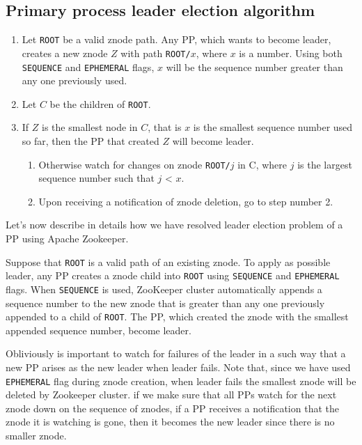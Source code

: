 \documentclass[sigchi]{acmart}
\begin{document}
\subsection{Primary process leader election algorithm}

\begin{algorithm}
\caption{}\label{alg:leaderElection}
\begin{enumerate}

\item Let \texttt{ROOT} be a valid znode path. Any PP, which wants to become leader, creates a new znode $Z$ with path \texttt{ROOT/$x$}, where $x$ is a number. Using both \texttt{SEQUENCE} and \texttt{EPHEMERAL} flags, $x$ will be the sequence number greater than any one previously used.

\item Let $C$ be the children of \texttt{ROOT}. 

\item If $Z$ is the smallest node in $C$, that is $x$ is the smallest sequence number used so far, then the PP that created $Z$ will become leader.

\begin{enumerate}

\item Otherwise watch for changes on znode \texttt{ROOT/$j$} in C, where $j$ is the largest sequence number such that $j$ < $x$.

\item Upon receiving a notification of znode deletion, go to step number 2. 

\end{enumerate}
\end{enumerate}
\end{algorithm}

Let's now describe in details how we have resolved leader election problem of a PP using Apache Zookeeper.

Suppose that \texttt{ROOT} is a valid path of an existing znode. To apply as possible leader, any PP creates a znode child into \texttt{ROOT} using \texttt{SEQUENCE} and \texttt{EPHEMERAL} flags. When \texttt{SEQUENCE} is used, ZooKeeper cluster automatically appends a sequence number to the new znode that is greater than any one previously appended to a child of \texttt{ROOT}. The PP, which created the znode with the smallest appended sequence number, become leader.

Obliviously is important to watch for failures of the leader in a such way that a new PP arises as the new leader when leader fails. Note that, since we have used \texttt{EPHEMERAL} flag during znode creation, when leader fails the smallest znode will be deleted by Zookeeper cluster. if we make sure that all PPs watch for the next znode down on the sequence of znodes, if a PP receives a notification that the znode it is watching is gone, then it becomes the new leader since there is no smaller znode. 
\end{document}
